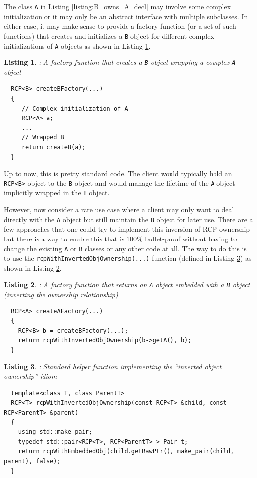 \documentclass[pdf,ps2pdf,11pt]{SANDreport}
\newtheorem{listing}{Listing}
\begin{document}
The class {}\texttt{A} in Listing {}\ref{listing:B_owns_A_decl} may
involve some complex initialization or it may only be an abstract
interface with multiple subclasses.  In either case, it may make sense
to provide a factory function (or a set of such functions) that
creates and initializes a {}\texttt{B} object for different complex
initializations of {}\texttt{A} objects as shown in Listing
{}\ref{listing:createBFactory}.

\begin{listing}: A factory function that creates a {}\texttt{B} object
wrapping a complex {}\texttt{A} object \\
\label{listing:createBFactory}
{\small\begin{verbatim}
  RCP<B> createBFactory(...)
  {
     // Complex initialization of A
     RCP<A> a;
     ...
     // Wrapped B
     return createB(a);
  }
\end{verbatim}}
\end{listing}

Up to now, this is pretty standard code.  The client would typically
hold an {}\texttt{RCP<B>} object to the {}\texttt{B} object and would
manage the lifetime of the {}\texttt{A} object implicitly wrapped in
the {}\texttt{B} object.

However, now consider a rare use case where a client may only want to
deal directly with the {}\texttt{A} object but still maintain the
{}\texttt{B} object for later use.  There are a few approaches that
one could try to implement this inversion of RCP ownership but there
is a way to enable this that is 100\% bullet-proof without having to
change the existing {}\texttt{A} or {}\texttt{B} classes or any other
code at all.  The way to do this is to use the
{}\texttt{rcpWithInvertedObjOwnership(...)} function (defined in
Listing {}\ref{listing:rcpWithInvertedObjOwnership}) as shown in
Listing {}\ref{listing:A_owns_B_owns_A}.

\begin{listing}: A factory function that returns an {}\texttt{A} object
embedded with a {}\texttt{B} object (inverting the ownership relationship) \\
\label{listing:A_owns_B_owns_A}
{\small\begin{verbatim}
  RCP<A> createAFactory(...)
  {
    RCP<B> b = createBFactory(...);
    return rcpWithInvertedObjOwnership(b->getA(), b);
  }
\end{verbatim}}
\end{listing}


\begin{listing}: Standard helper function implementing the ``inverted
object ownership'' idiom \\
\label{listing:rcpWithInvertedObjOwnership}
{\small\begin{verbatim}
  template<class T, class ParentT>
  RCP<T> rcpWithInvertedObjOwnership(const RCP<T> &child, const RCP<ParentT> &parent)
  {
    using std::make_pair;
    typedef std::pair<RCP<T>, RCP<ParentT> > Pair_t;
    return rcpWithEmbeddedObj(child.getRawPtr(), make_pair(child, parent), false);
  }
\end{verbatim}}
\end{listing}
\end{document}
